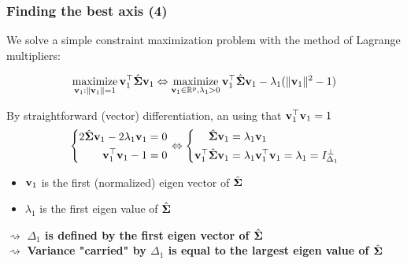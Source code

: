 \documentclass{beamer}\usepackage[]{graphicx}\usepackage[]{color}
\begin{document}
\begin{frame}
  \frametitle{Finding the best axis (4)}

  We solve a simple constraint maximization problem with the method of Lagrange multipliers:
  
  \begin{equation*}
    \mathop{\mathrm{maximize}}_{\mathbf{v}_1: \|\mathbf{v}_1\| = 1 } \mathbf{v}_1^\top \hat{\boldsymbol{\Sigma}} \mathbf{v}_1 \Leftrightarrow \mathop{\mathrm{maximize}}_{\mathbf{v}_1\in\mathbb{R}^p, \lambda_1 > 0} \mathbf{v}_1^\top \hat{\boldsymbol{\Sigma}} \mathbf{v}_1 - \lambda_1 (\|\mathbf{v}_1\|^2 - 1)
  \end{equation*}
  
  By straightforward (vector) differentiation, an using that $\mathbf{v}_1^\top \mathbf{v}_1 = 1$
  \begin{equation*}
    \left\{\begin{aligned}
      2\hat{\boldsymbol{\Sigma}} \mathbf{v}_1 - 2\lambda_1 \mathbf{v}_1 & = 0 \\  
      \mathbf{v}_1^\top \mathbf{v}_1 - 1 & = 0 \\  
    \end{aligned}\right. \Leftrightarrow
    \left\{\begin{aligned}
      \hat{\boldsymbol{\Sigma}} \mathbf{v}_1 & = \lambda_1 \mathbf{v}_1  \\  
      \mathbf{v}_1^\top \hat{\boldsymbol{\Sigma}} \mathbf{v}_1 & = \lambda_1 \mathbf{v}_1^\top \mathbf{v}_1 = \lambda_1 = I_{\Delta_1}^\bot \\  
    \end{aligned}\right.
  \end{equation*}
  
  \begin{itemize} 
     \item $\mathbf{v}_1$ is the first (normalized) eigen vector of $\hat{\boldsymbol{\Sigma}}$
     \item $\lambda_1$ is the first eigen value of $\hat{\boldsymbol{\Sigma}}$
   \end{itemize} 
  
  $\rightsquigarrow$ \alert{\bf $\Delta_1$ is defined by the first eigen vector of $\hat{\boldsymbol{\Sigma}}$}\\
  $\rightsquigarrow$ \alert{\bf Variance "carried" by $\Delta_1$ is equal to the largest eigen value of $\hat{\boldsymbol{\Sigma}}$}
  
\end{frame}
\end{document}
